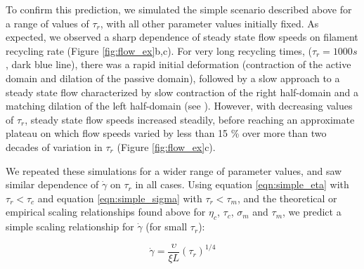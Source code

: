 \documentclass[10pt,letterpaper]{article}
\begin{document}
To confirm this prediction, we simulated the simple scenario described above for a range of values of $\tau_r$, with all other parameter values initially fixed. As expected, we observed a sharp dependence of steady state flow speeds on filament recycling rate (Figure \ref{fig:flow_ex}b,c). For very long recycling times, ($\tau_r=1000 s$, dark blue line), there was a rapid initial deformation (contraction of the active domain and dilation of the passive domain), followed by a slow approach to a steady state flow characterized by slow contraction of the right half-domain and a matching dilation of the left half-domain (see ).  However, with decreasing values of $\tau_r$, steady state flow speeds increased steadily, before reaching an approximate plateau on which flow speeds varied by less than 15 \% over more than two decades of variation in $\tau_r$ (Figure \ref{fig:flow_ex}c).  

We repeated these simulations for a wider range of parameter values, and saw similar dependence of $\dot{\gamma}$ on $\tau_r$ in all cases.  Using equation \ref{eqn:simple_eta} with $\tau_r < \tau_c$ and equation \ref{eqn:simple_sigma} with $\tau_r < \tau_m$, and the theoretical or empirical scaling relationships found above for $\eta_c$, $\tau_c$, $\sigma_m$ and $\tau_m$, we predict a simple scaling relationship for $\dot{\gamma}$ (for small $\tau_r$):


\begin{equation}
\label{eqn:flow_scaling_eq}
\dot{\gamma} = \frac{\upsilon}{\xi L}  \left ( \tau_r \right ) ^{1/4}
\end{equation}
\end{document}
